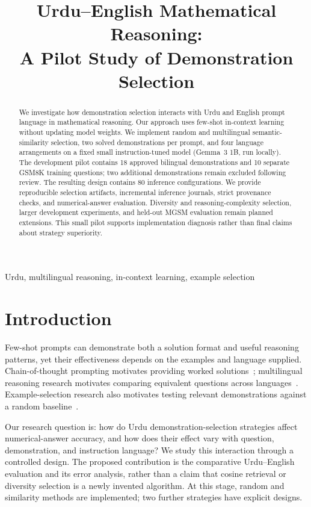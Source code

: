 \documentclass[conference]{IEEEtran}
\title{Urdu--English Mathematical Reasoning:\\A Pilot Study of Demonstration Selection}
\author{\IEEEauthorblockN{Ammar Anees, Hussain Baqar, Rayyan Hasib, and Saad ur Rehman}}
\begin{document}
\maketitle
\begin{abstract}
We investigate how demonstration selection interacts with Urdu and English prompt language in mathematical reasoning. Our approach uses few-shot in-context learning without updating model weights. We implement random and multilingual semantic-similarity selection, two solved demonstrations per prompt, and four language arrangements on a fixed small instruction-tuned model (Gemma~3 1B, run locally). The development pilot contains 18 approved bilingual demonstrations and 10 separate GSM8K training questions; two additional demonstrations remain excluded following review. The resulting design contains 80 inference configurations. We provide reproducible selection artifacts, incremental inference journals, strict provenance checks, and numerical-answer evaluation.  Diversity and reasoning-complexity selection, larger development experiments, and held-out MGSM evaluation remain planned extensions. This small pilot supports implementation diagnosis rather than final claims about strategy superiority.
\end{abstract}
\begin{IEEEkeywords}
Urdu, multilingual reasoning, in-context learning, example selection
\end{IEEEkeywords}

\section{Introduction}
Few-shot prompts can demonstrate both a solution format and useful reasoning patterns, yet their effectiveness depends on the examples and language supplied. Chain-of-thought prompting motivates providing worked solutions~\cite{wei}; multilingual reasoning research motivates comparing equivalent questions across languages~\cite{shi}. Example-selection research also motivates testing relevant demonstrations against a random baseline~\cite{liu}.

Our research question is: how do Urdu demonstration-selection strategies affect numerical-answer accuracy, and how does their effect vary with question, demonstration, and instruction language? We study this interaction through a controlled design. The proposed contribution is the comparative Urdu--English evaluation and its error analysis, rather than a claim that cosine retrieval or diversity selection is a newly invented algorithm. At this stage, random and similarity methods are implemented; two further strategies have explicit designs.
\end{document}
